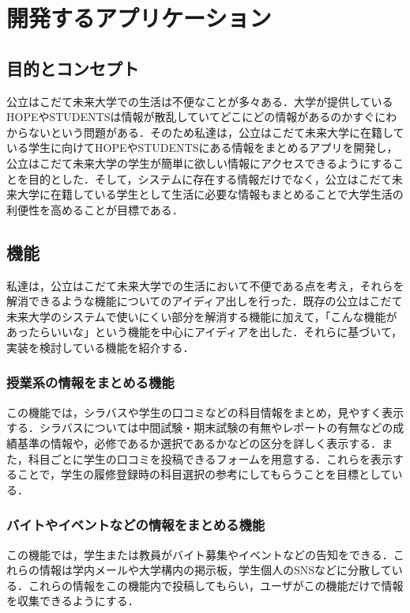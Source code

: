 \chapter{開発するアプリケーション }

\section{目的とコンセプト}
公立はこだて未来大学での生活は不便なことが多々ある．大学が提供しているHOPEやSTUDENTSは情報が散乱していてどこにどの情報があるのかすぐにわからないという問題がある．そのため私達は，公立はこだて未来大学に在籍している学生に向けてHOPEやSTUDENTSにある情報をまとめるアプリを開発し，公立はこだて未来大学の学生が簡単に欲しい情報にアクセスできるようにすることを目的とした．そして，システムに存在する情報だけでなく，公立はこだて未来大学に在籍している学生として生活に必要な情報もまとめることで大学生活の利便性を高めることが目標である．


\section{機能}
私達は，公立はこだて未来大学での生活において不便である点を考え，それらを解消できるような機能についてのアイディア出しを行った．既存の公立はこだて未来大学のシステムで使いにくい部分を解消する機能に加えて，「こんな機能があったらいいな」という機能を中心にアイディアを出した．それらに基づいて，実装を検討している機能を紹介する．

\subsection{授業系の情報をまとめる機能}
この機能では，シラバスや学生の口コミなどの科目情報をまとめ，見やすく表示する．シラバスについては中間試験・期末試験の有無やレポートの有無などの成績基準の情報や，必修であるか選択であるかなどの区分を詳しく表示する．また，科目ごとに学生の口コミを投稿できるフォームを用意する．これらを表示することで，学生の履修登録時の科目選択の参考にしてもらうことを目標としている．

\subsection{バイトやイベントなどの情報をまとめる機能}
この機能では，学生または教員がバイト募集やイベントなどの告知をできる．これらの情報は学内メールや大学構内の掲示板，学生個人のSNSなどに分散している．これらの情報をこの機能内で投稿してもらい，ユーザがこの機能だけで情報を収集できるようにする．

